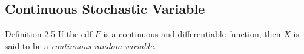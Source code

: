 \subsection{Continuous Stochastic Variable}
\begin{boks}{Definition 2.5}
If the cdf $F$ is a continuous and differentiable function, then $X$ is said to be a \textit{continuous random variable}.
\end{boks}



